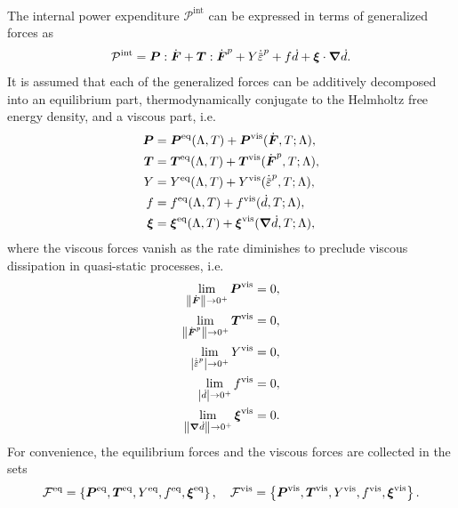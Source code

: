 The internal power expenditure $\mathcal{P}^\text{int}$ can be expressed in terms of generalized forces as
\begin{align}
  \mathcal{P}^\text{int} = \bfP:\dot{\bfF} + \bfT:\dot{\defgrad}^p + Y\epdot + f\dot{d} + \bs{\xi}\cdot\grad\dot{d}.
\end{align}
It is assumed that each of the generalized forces can be additively decomposed into an equilibrium part, thermodynamically conjugate to the Helmholtz free energy density, and a viscous part, i.e.
\begin{subequations}
  \begin{align}
    \bfP     & = \bfP^\text{eq}(\Lambda, T) + \bfP^\text{vis}(\dot{\defgrad}, T; \Lambda),       \\
    \bfT     & = \bfT^\text{eq}(\Lambda, T) + \bfT^\text{vis}(\dot{\defgrad}^p, T; \Lambda),     \\
    Y        & = Y^\text{eq}(\Lambda, T) + Y^\text{vis}(\epdot, T; \Lambda),                     \\
    f        & = f^\text{eq}(\Lambda, T) + f^\text{vis}(\dot{d}, T; \Lambda),                    \\
    \bs{\xi} & = \bs{\xi}^\text{eq}(\Lambda, T) + \bs{\xi}^\text{vis}(\grad\dot{d}, T; \Lambda), 
  \end{align}
\end{subequations}
where the viscous forces vanish as the rate diminishes to preclude viscous dissipation in quasi-static processes, i.e.
\begin{subequations}
  \begin{align}
    \lim_{\norm{\dot{\defgrad}} \to 0^+}\bfP^\text{vis}   & = 0, \\
    \lim_{\norm{\dot{\defgrad}^p} \to 0^+}\bfT^\text{vis} & = 0, \\
    \lim_{\abs{\epdot} \to 0^+}Y^\text{vis}               & = 0, \\
    \lim_{\abs{\dot{d}} \to 0^+}f^\text{vis}              & = 0, \\
    \lim_{\norm{\grad\dot{d}} \to 0^+}\bs{\xi}^\text{vis} & = 0. 
  \end{align}
\end{subequations}
For convenience, the equilibrium forces and the viscous forces are collected in the sets
\begin{align}
  \mathcal{F}^\text{eq} = \left\{ \boldsymbol{P}^\text{eq}, \boldsymbol{T}^\text{eq}, Y^\text{eq}, f^\text{eq}, \boldsymbol{\xi}^\text{eq} \right\}, \quad \mathcal{F}^\text{vis} = \left\{ \boldsymbol{P}^\text{vis}, \boldsymbol{T}^\text{vis}, Y^\text{vis}, f^\text{vis}, \boldsymbol{\xi}^\text{vis} \right\}.
\end{align}


